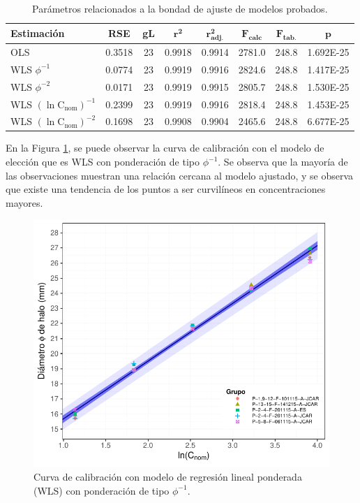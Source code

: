 \documentclass{article}
\begin{document}
\begin{table}[H]
	\centering
	\begin{tabular}{lccccccc}
		\hline
		\textbf{Estimación} & \textbf{RSE} & \textbf{gL} & $ \mathbf{r^{2}} $ & $ \mathbf{r^{2}_{adj.}} $ & $ \mathbf{F_{calc}} $ & $ \mathbf{F_{tab.}} $ & $ \mathbf{p} $ \\ \hline
		OLS          &    0.3518    &     23      &       0.9918       &          0.9914           &         2781.0          &         248.8         &  1.692E-25  \\
		WLS $\phi^{-1}$          &    0.0774    &     23      &       0.9919       &          0.9916           &        2824.6         &         248.8         &  1.417E-25  \\
		WLS $\phi^{-2}$          &    0.0171    &     23      &       0.9919       &          0.9915           &        2805.7         &         248.8         &  1.530E-25  \\
		WLS $ \left(\ln{\mathrm{C_{nom}}}\right)^{-1} $          &    0.2399    &     23      &       0.9919       &          0.9916           &        2818.4         &         248.8         &  1.453E-25  \\
		WLS $ \left(\ln{\mathrm{C_{nom}}}\right)^{-2} $          &    0.1698    &     23      &       0.9908       &          0.9904           &        2465.6         &         248.8         &  6.677E-25  \\ \hline
	\end{tabular} 
\caption{Parámetros relacionados a la bondad de ajuste de modelos probados.}
\label{Cuadro:2}
\end{table}

\noindent
En la Figura \ref{Fig:3}, se puede observar la curva de calibración con el modelo de elección que es WLS con ponderación de tipo $\phi^{-1}$. Se observa que la mayoría de las observaciones muestran una relación cercana al modelo ajustado, y se observa que existe una tendencia de los puntos a ser curvilíneos en concentraciones mayores. \\


\begin{figure}[H]
	\centering
	\includegraphics[width=0.8\linewidth]{Figuras/22_curva_calibracion_1.pdf}
	\caption[Diferentes modelos de regresión]{Curva de calibración con modelo de regresión lineal ponderada (WLS) con ponderación de tipo $\phi^{-1}$.}
	\label{Fig:3}
\end{figure}
\end{document}
